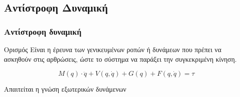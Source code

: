 \documentclass[8pt,sans,mathserif]{beamer}%
\begin{document}
\subsection{Αντίστροφη Δυναμική}
\begin{frame}
\frametitle{Αντίστροφη δυναμική}

    \begin{block}{Ορισμός}
           Είναι η έρευνα των γενικευμένων ροπών ή δυνάμεων που πρέπει να ασκηθούν στις αρθρώσεις, ώστε το σύστημα να παράξει την συγκεκριμένη κίνηση.
    \end{block}

    \pause

    \begin{equation*}
        M(q) \cdot \ddot{q} + V(q, \dot{q}) + G(q) + F(q, \dot{q}) = \tau
    \end{equation*}

    \pause

    \begin{center}
        \alert{Απαιτείται η γνώση εξωτερικών δυνάμενων}
    \end{center}

\end{frame}
\end{document}

